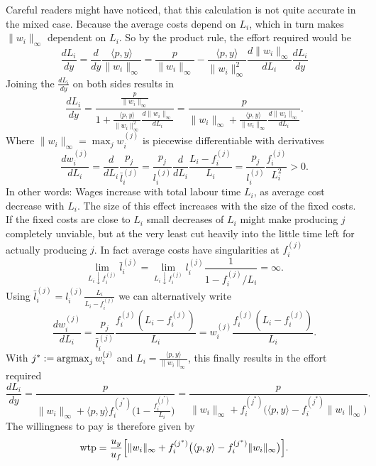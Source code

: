 Careful readers might have noticed, that
this calculation is not quite accurate in the mixed case. Because the average
costs depend on \(L_i\), which in turn makes \(\|w_i\|_\infty\) dependent on
\(L_i\). So by the product rule, the effort required would be
\[
		\frac{dL_i}{dy}
		= \frac{d}{dy} \frac{\langle p, y\rangle}{\|w_i\|_\infty}
		= \frac{p}{\|w_i\|_\infty}
		- \frac{\langle p, y\rangle}{\|w_i\|_\infty^2}
		\frac{d\|w_i\|_\infty}{dL_i}\frac{dL_i}{dy}
\]
Joining the \(\frac{dL_i}{dy}\) on both sides results in
\[
	\frac{dL_i}{dy}
	= \frac{\frac{p}{\|w_i\|_\infty}}{
		1 + \frac{\langle p, y\rangle}{\|w_i\|_\infty^2}
		\frac{d\|w_i\|_\infty}{dL_i}
	}
	= \frac{p}{
		\|w_i\|_\infty + \frac{\langle p, y\rangle}{\|w_i\|_\infty}
		\frac{d\|w_i\|_\infty}{dL_i}
	}.
\]
Where \(\|w_i\|_\infty=\max_{j} w_i^{(j)}\) is piecewise differentiable with
derivatives
\[
	\frac{dw_i^{(j)}}{dL_i}
	= \frac{d}{dL_i} \frac{p_j}{\bar{l}_i^{(j)}}
	= \frac{p_j}{l_i^{(j)}} \frac{d}{dL_i} \frac{L_i-f_i^{(j)}}{L_i}
	= \frac{p_j}{l_i^{(j)}} \frac{f_i^{(j)}}{L_i^2} > 0.
\]
In other words: Wages increase with total labour time \(L_i\), as
average cost decrease with \(L_i\). The size of this effect increases with the
size of the fixed costs. If the fixed costs are close to \(L_i\) small decreases
of \(L_i\) might make producing \(j\) completely unviable, but at the very least
cut heavily into the little time left for actually producing \(j\). In fact
average costs have singularities at \(f_i^{(j)}\)
\[
	\lim_{L_i\downarrow f_i^{(j)}} \bar{l}_i^{(j)}
	= \lim_{L_i\downarrow f_i^{(j)}}l_i^{(j)}\frac{1}{1-f_i^{(j)}/L_i}
	= \infty.
\]
Using \(\bar{l}_i^{(j)}=l_i^{(j)}\frac{L_i}{L_i-f_i^{(j)}}\) we can alternatively
write
\[
	\frac{dw_i^{(j)}}{dL_i}
	= \frac{p_j}{\bar{l}_i^{(j)}} \frac{f_i^{(j)}(L_i-f_i^{(j)})}{L_i}
	= w_i^{(j)} \frac{f_i^{(j)}(L_i-f_i^{(j)})}{L_i}.
\]
With \(j^* := \operatorname*{argmax}_{j} w_i^{(j)}\) and \(L_i = \frac{\langle p,
y\rangle}{\|w_i\|_\infty}\), this finally results in the effort required
\[
	\frac{dL_i}{dy}
	= \frac{p}{
		\|w_i\|_\infty + \langle p, y\rangle f_i^{(j^*)}
		\bigl(1-\frac{f_i^{(j^*)}}{L_i}\bigr)
	}
	= \frac{p}{
		\|w_i\|_\infty + f_i^{(j^*)}
		\bigl(\langle p, y\rangle-f_i^{(j^*)}\|w_i\|_\infty\bigr)
	}.
\]
The willingness to pay is therefore given by
\[
	\operatorname{wtp} = \frac{u_y}{u_f}\Bigl[
		\|w_i\|_\infty + f_i^{(j^*)}
		\bigl(\langle p, y\rangle-f_i^{(j^*)}\|w_i\|_\infty\bigr)
	\Bigr].
\]
